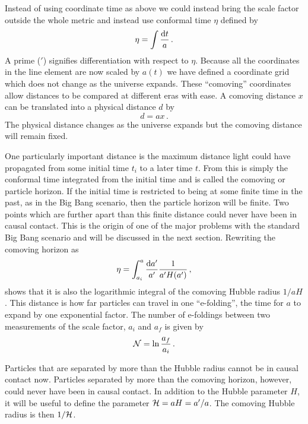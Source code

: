 Instead of using coordinate time as above we could instead bring
the scale factor outside the
whole metric and instead use conformal time $\eta$ defined by
\begin{equation}
\label{eq:etatime-intro}
 \eta = \int\frac{\mathrm{d} t}{a}\,.
\end{equation}
A prime ($'$) signifies differentiation with respect to $\eta$. 
Because all the coordinates in the line element are now scaled by $a(t)$ we
have defined a coordinate grid which does not change as the universe expands.
These ``comoving'' coordinates allow distances to be compared at different
eras with ease. A comoving distance $x$ can be translated into a physical
distance $d$ by
% 
\begin{equation}
 \label{eq:comovingdefn-intro}
 d = ax \,.
\end{equation}
The physical distance changes as the universe expands but the comoving distance
will remain fixed. 

One particularly important distance is the maximum distance light could have
propagated from some initial time $t_i$ to a later time $t$. From
 this is simply the conformal time integrated from
the initial time and is called the comoving or particle horizon.
If the initial time is restricted to
being at some finite time in the past, as in the Big Bang scenario, then the
particle horizon will be finite. Two points which are further apart than
this finite distance could never have been in causal contact. This
is the origin of one of the major problems with the standard Big Bang scenario
and will be discussed in the next section.
Rewriting the comoving horizon as
% 
\begin{equation}
 \eta = \int_{a_i}^a \frac{\mathrm{d} a'}{a'} \frac{1}{a' H(a')} \,,
\end{equation}
shows that it is also the logarithmic integral of the comoving Hubble
radius $1/aH$. This distance is how far particles can travel in one
``e-folding'', the time for $a$ to expand by one exponential factor. 
The number of e-foldings between two measurements of the scale factor, $a_i$
and $a_f$ is given by
\begin{equation}
\label{eq:nefolddefn-intro}
 \mathcal{N} = \ln \frac{a_f}{a_i}\,.
\end{equation}

Particles
that are separated by more than the Hubble radius cannot be in causal
contact now. Particles separated by more than the
comoving horizon, however, could never have been in causal contact. In addition
to the Hubble parameter $H$, it will be useful
to define the parameter $\mathcal{H} = aH = a'/a$. The comoving Hubble radius is then
$1/\mathcal{H}$.






